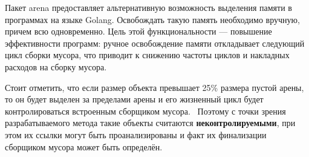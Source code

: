 Пакет arena предоставляет альтернативную возможность выделения памяти в программах на языке Golang. Освобождать такую память необходимо вручную, причем всю одновременно. Цель этой функциональности --- повышение эффективности программ: ручное освобождение памяти откладывает следующий цикл сборки мусора, что приводит к снижению частоты циклов и накладных расходов на сборку мусора.~\cite{golang_arena_cource}




Стоит отметить, что если размер объекта превышает 25\% размера пустой арены, то он будет выделен за пределами арены и его жизненный цикл будет контролироваться встроенным сборщиком мусора.~\cite{golang_arena_limits} Поэтому с точки зрения разрабатываемого метода такие объекты считаются \textbf{неконтролируемыми}, при этом их ссылки могут быть проанализированы и факт их финализации сборщиком мусора может быть определён.

